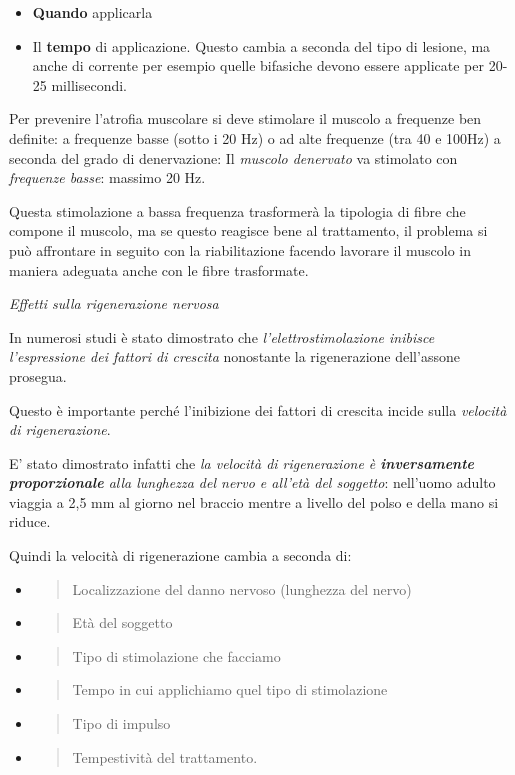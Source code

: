\documentclass[]{article}
\begin{document}
\begin{itemize}
\item
  \textbf{Quando} applicarla
\item
  Il \textbf{tempo} di applicazione. Questo cambia a seconda del tipo di
  lesione, ma anche di corrente per esempio quelle bifasiche devono
  essere applicate per 20-25 millisecondi.
\end{itemize}

Per prevenire l'atrofia muscolare si deve stimolare il muscolo a
frequenze ben definite: a frequenze basse (sotto i 20 Hz) o ad alte
frequenze (tra 40 e 100Hz) a seconda del grado di denervazione: Il
\emph{muscolo denervato} va stimolato con \emph{frequenze basse}:
massimo 20 Hz.

Questa stimolazione a bassa frequenza trasformerà la tipologia di fibre
che compone il muscolo, ma se questo reagisce bene al trattamento, il
problema si può affrontare in seguito con la riabilitazione facendo
lavorare il muscolo in maniera adeguata anche con le fibre trasformate.

\emph{Effetti sulla rigenerazione nervosa}

In numerosi studi è stato dimostrato che \emph{l'elettrostimolazione
inibisce l'espressione dei fattori di crescita} nonostante la
rigenerazione dell'assone prosegua.

Questo è importante perché l'inibizione dei fattori di crescita incide
sulla \emph{velocità di rigenerazione}.

E' stato dimostrato infatti che \emph{la velocità di rigenerazione è
\textbf{inversamente proporzionale} alla lunghezza del nervo e all'età
del soggetto}: nell'uomo adulto viaggia a 2,5 mm al giorno nel braccio
mentre a livello del polso e della mano si riduce.

Quindi la velocità di rigenerazione cambia a seconda di:

\begin{itemize}
\item
  \begin{quote}
  Localizzazione del danno nervoso (lunghezza del nervo)
  \end{quote}
\item
  \begin{quote}
  Età del soggetto
  \end{quote}
\item
  \begin{quote}
  Tipo di stimolazione che facciamo
  \end{quote}
\item
  \begin{quote}
  Tempo in cui applichiamo quel tipo di stimolazione
  \end{quote}
\item
  \begin{quote}
  Tipo di impulso
  \end{quote}
\item
  \begin{quote}
  Tempestività del trattamento.
  \end{quote}
\end{itemize}
\end{document}

